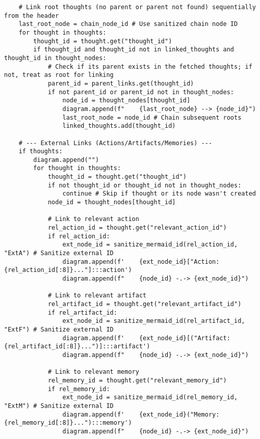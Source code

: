 \documentclass[12pt,a4paper]{article}
\begin{document}
\begin{pageablecode}
\begin{verbatim}
    # Link root thoughts (no parent or parent not found) sequentially from the header
    last_root_node = chain_node_id # Use sanitized chain node ID
    for thought in thoughts:
        thought_id = thought.get("thought_id")
        if thought_id and thought_id not in linked_thoughts and thought_id in thought_nodes:
            # Check if its parent exists in the fetched thoughts; if not, treat as root for linking
            parent_id = parent_links.get(thought_id)
            if not parent_id or parent_id not in thought_nodes:
                node_id = thought_nodes[thought_id]
                diagram.append(f"    {last_root_node} --> {node_id}")
                last_root_node = node_id # Chain subsequent roots
                linked_thoughts.add(thought_id)

    # --- External Links (Actions/Artifacts/Memories) ---
    if thoughts:
        diagram.append("")
        for thought in thoughts:
            thought_id = thought.get("thought_id")
            if not thought_id or thought_id not in thought_nodes:
                continue # Skip if thought or its node wasn't created
            node_id = thought_nodes[thought_id]

            # Link to relevant action
            rel_action_id = thought.get("relevant_action_id")
            if rel_action_id:
                ext_node_id = sanitize_mermaid_id(rel_action_id, "ExtA") # Sanitize external ID
                diagram.append(f'    {ext_node_id}["Action: {rel_action_id[:8]}..."]:::action')
                diagram.append(f"    {node_id} -.-> {ext_node_id}")

            # Link to relevant artifact
            rel_artifact_id = thought.get("relevant_artifact_id")
            if rel_artifact_id:
                ext_node_id = sanitize_mermaid_id(rel_artifact_id, "ExtF") # Sanitize external ID
                diagram.append(f'    {ext_node_id}[("Artifact: {rel_artifact_id[:8]}...")]:::artifact')
                diagram.append(f"    {node_id} -.-> {ext_node_id}")

            # Link to relevant memory
            rel_memory_id = thought.get("relevant_memory_id")
            if rel_memory_id:
                ext_node_id = sanitize_mermaid_id(rel_memory_id, "ExtM") # Sanitize external ID
                diagram.append(f'    {ext_node_id}("Memory: {rel_memory_id[:8]}..."):::memory')
                diagram.append(f"    {node_id} -.-> {ext_node_id}")


\end{verbatim}
\end{pageablecode}
\end{document}

